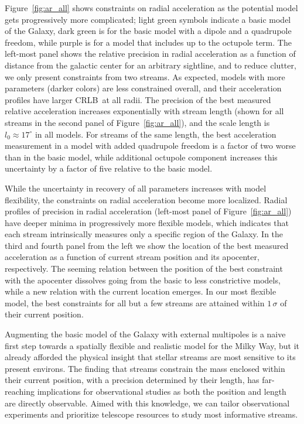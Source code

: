 \documentclass[modern]{aastex61}
\newcommand{\acronym}[1]{{\small{#1}}}
\newcommand{\CRLB}{\acronym{CRLB}}
\begin{document}
Figure~\ref{fig:ar_all} shows constraints on radial acceleration as the potential model gets progressively more complicated; light green symbols indicate a basic model of the Galaxy, dark green is for the basic model with a dipole and a quadrupole freedom, while purple is for a model that includes up to the octupole term.
The left-most panel shows the relative precision in radial acceleration as a function of distance from the galactic center for an arbitrary sightline, and to reduce clutter, we only present constraints from two streams.
As expected, models with more parameters (darker colors) are less constrained overall, and their acceleration profiles have larger \CRLB\ at all radii. 
The precision of the best measured relative acceleration increases exponentially with stream length (shown for all streams in the second panel of Figure~\ref{fig:ar_all}), and the scale length is $l_0\approx17^\circ$ in all models.
For streams of the same length, the best acceleration measurement in a model with added quadrupole freedom is a factor of two worse than in the basic model, while additional octupole component increases this uncertainty by a factor of five relative to the basic model.

While the uncertainty in recovery of all parameters increases with model flexibility, the constraints on radial acceleration become more localized.
Radial profiles of precision in radial acceleration (left-most panel of Figure~\ref{fig:ar_all}) have deeper minima in progressively more flexible models, which indicates that each stream intrinsically measures only a specific region of the Galaxy.
In the third and fourth panel from the left we show the location of the best measured acceleration as a function of current stream position and its apocenter, respectively.
The seeming relation between the position of the best constraint with the apocenter dissolves going from the basic to less constrictive models, while a new relation with the current location emerges.
In our most flexible model, the best constraints for all but a few streams are attained within $1\,\sigma$ of their current position.

Augmenting the basic model of the Galaxy with external multipoles is a naive first step towards a spatially flexible and realistic model for the Milky Way, but it already afforded the physical insight that stellar streams are most sensitive to its present environs.
The finding that streams constrain the mass enclosed within their current position, with a precision determined by their length, has far-reaching implications for observational studies as both the position and length are directly observable.
Aimed with this knowledge, we can tailor observational experiments and prioritize telescope resources to study most informative streams.
\end{document}
